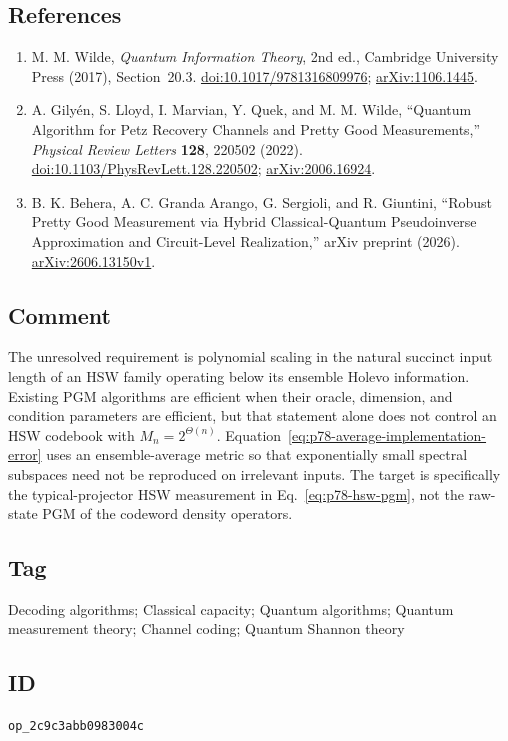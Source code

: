 \subsection*{References}

\begin{enumerate}[label={},leftmargin=4.8em,labelsep=0.5em]
  \footnotesize
  \item[\textup{[Wil17]}]\label{ref:p78-wilde}
  M. M. Wilde, \emph{Quantum Information Theory}, 2nd ed., Cambridge
  University Press (2017), Section~20.3.
  \href{https://doi.org/10.1017/9781316809976}%
       {doi:10.1017/9781316809976};
  \href{https://arxiv.org/abs/1106.1445}{arXiv:1106.1445}.

  \item[\textup{[GLM+22]}]\label{ref:p78-gilyen-et-al}
  A. Gily\'en, S. Lloyd, I. Marvian, Y. Quek, and M. M. Wilde,
  ``Quantum Algorithm for Petz Recovery Channels and Pretty Good
  Measurements,'' \emph{Physical Review Letters}
  \textbf{128}, 220502 (2022).
  \href{https://doi.org/10.1103/PhysRevLett.128.220502}%
       {doi:10.1103/PhysRevLett.128.220502};
  \href{https://arxiv.org/abs/2006.16924}{arXiv:2006.16924}.

  \item[\textup{[BGS+26]}]\label{ref:p78-behera-et-al}
  B. K. Behera, A. C. Granda Arango, G. Sergioli, and R. Giuntini,
  ``Robust Pretty Good Measurement via Hybrid Classical-Quantum
  Pseudoinverse Approximation and Circuit-Level Realization,'' arXiv preprint
  (2026).
  \href{https://arxiv.org/abs/2606.13150v1}{arXiv:2606.13150v1}.
\end{enumerate}

\subsection*{Comment}

The unresolved requirement is polynomial scaling in the natural succinct
input length of an HSW family operating below its ensemble Holevo information.
Existing PGM algorithms are
efficient when their oracle, dimension, and condition parameters are
efficient, but that statement alone does not control an HSW codebook with
$M_n=2^{\Theta(n)}$.  Equation~\eqref{eq:p78-average-implementation-error}
uses an ensemble-average metric so that exponentially small spectral
subspaces need not be reproduced on irrelevant inputs.  The target is
specifically the typical-projector HSW measurement in
Eq.~\eqref{eq:p78-hsw-pgm}, not the raw-state PGM of the codeword density
operators.

\subsection*{Tag}

Decoding algorithms; Classical capacity; Quantum algorithms; Quantum
measurement theory; Channel coding; Quantum Shannon theory

\subsection*{ID}

\texttt{op\_2c9c3abb0983004c}
